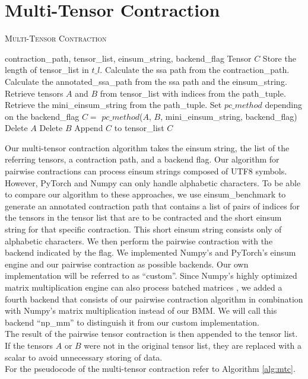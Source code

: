 \section{Multi-Tensor Contraction}
\begin{algorithm}[H]
    \caption{\textsc{Multi-Tensor Contraction}}
    \label{alg:mtc}
    \begin{algorithmic}[1]
        \REQUIRE  contraction\_path,  tensor\_list, einsum\_string, backend\_flag 
        \ENSURE Tensor $C$
        \STATE Store the length of tensor\_list in   $t\_l$.
        \STATE Calculate the ssa path from the contraction\_path.
        \STATE Calculate the annotated\_ssa\_path from the ssa path and the einsum\_string. 
        \STATE Retrieve tensors $A$ and $B$ from tensor\_list with indices from the path\_tuple.
        \STATE  Retrieve the mini\_einsum\_string from the path\_tuple.
        \STATE Set $pc\_method$ depending on the backend\_flag 
        \STATE  $C =$ $pc\_method$($A$, $B$, mini\_einsum\_string, backend\_flag) 
        \STATE Delete $ A$ 
        \ENDIF
        \STATE Delete $ B$ 
        \ENDIF
        \STATE Append $ C $ to tensor\_list 
        \ENDFOR
        \RETURN  $C$ 
    \end{algorithmic}
\end{algorithm}
Our multi-tensor contraction algorithm takes the einsum string, the list of the referring tensors, a contraction path, and a backend flag. Our algorithm for pairwise contractions can process einsum strings composed of UTF8 symbols. However, PyTorch \cite{PyTorch} and Numpy \cite{Numpy} can only handle alphabetic characters. 
To be able to compare our algorithm to these approaches, we use einsum\_benchmark \cite{blacher2024einsum} to generate an annotated contraction path that contains a list of pairs of indices for the tensors in the tensor list that are to be contracted and the short einsum string for that specific contraction. 
This short einsum string consists only of alphabetic characters. We then perform the pairwise contraction with the backend indicated by the flag. 
We implemented Numpy's and PyTorch's einsum engine and our pairwise contraction as possible backends. Our own implementation will be referred to as ``custom''. Since Numpy's highly optimized matrix multiplication engine can also process batched matrices \cite{Numpy}, we added a fourth backend that consists of our pairwise contraction algorithm in combination with Numpy's matrix multiplication instead of our BMM. We will call this backend ``np\_mm'' to distinguish it from our custom implementation. \\
The result of the pairwise tensor contraction is then appended to the tensor list. If the tensors $A$ or $B$ were not in the original tensor list, they are replaced with a scalar to avoid unnecessary storing of data.\\
For the pseudocode of the multi-tensor contraction refer to Algorithm \ref{alg:mtc}.


